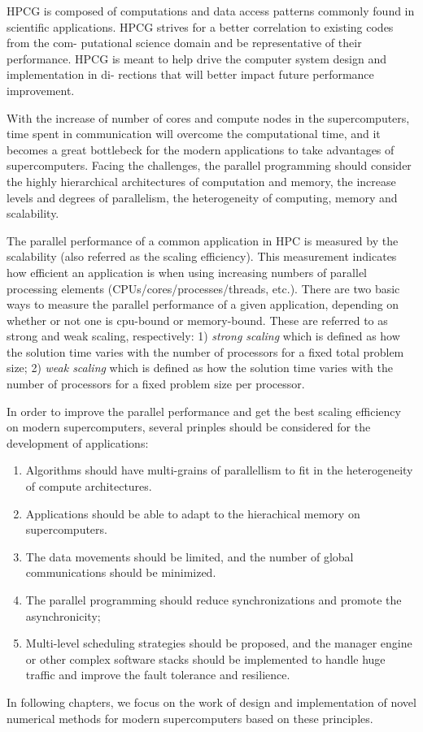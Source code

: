 HPCG \cite{dongarra2015hpcg} is composed of computations and data access patterns commonly found in scientific applications. HPCG strives for a better correlation to existing codes from the com- putational science domain and be representative of their performance. HPCG is meant to help drive the computer system design and implementation in di- rections that will better impact future performance improvement.

With the increase of number of cores and compute nodes in the supercomputers, time spent in communication will overcome the computational time, and it becomes a great bottlebeck for the modern applications to take advantages of supercomputers. Facing the challenges, the parallel programming should consider the highly hierarchical architectures of computation and memory, the increase levels and degrees of parallelism, the heterogeneity of computing, memory and scalability.

The parallel performance of a common application in HPC is measured by the scalability (also referred as the scaling efficiency). This measurement indicates how efficient an application is when using increasing numbers of parallel processing elements (CPUs/cores/processes/threads, etc.). There are two basic ways to measure the parallel performance of a given application, depending on whether or not one is cpu-bound or memory-bound. These are referred to as strong and weak scaling, respectively: 1) \textit{strong scaling} which is defined as how the solution time varies with the number of processors for a fixed total problem size; 2) \textit{weak scaling} which is defined as how the solution time varies with the number of processors for a fixed problem size per processor.

In order to improve the parallel performance and get the best scaling efficiency on modern supercomputers, several prinples should be considered for the development of applications:

	\begin{enumerate}
		\item Algorithms should have multi-grains of parallellism to fit in the heterogeneity of compute architectures.
		\item Applications should be able to adapt to the hierachical memory on supercomputers.
		\item The data movements should be limited, and the number of global communications should be minimized.
		\item The parallel programming should reduce synchronizations and promote the asynchronicity;
		\item Multi-level scheduling strategies should be proposed,  and the manager engine or other complex software stacks should be implemented to handle huge traffic and improve the fault tolerance and resilience.
	\end{enumerate}

In following chapters, we focus on the work of design and implementation of novel numerical methods for modern supercomputers based on these principles.

\clearemptydoublepage